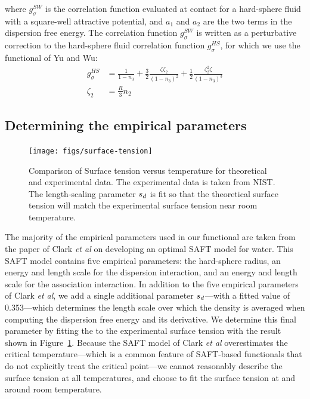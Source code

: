 \documentclass[letterpaper,twocolumn,amsmath,amssymb,prb]{revtex4-1}
\begin{document}
where $g^\textit{SW}_\sigma$ is the correlation function evaluated at
contact for a hard-sphere fluid with a square-well attractive
potential, and $a_1$ and $a_2$ are the two terms in the dispersion
free energy.  The correlation function $g^\textit{SW}_\sigma$ is
written as a perturbative correction to the hard-sphere fluid
correlation function $g^\textit{HS}_\sigma$, for which we use the
functional of Yu and Wu\cite{yu2002fmt-dft-inhomogeneous-associating}:
\begin{align}
  g_\sigma^{HS} &= \frac{1}{1-n_3}
  +\frac32\frac{\zeta\zeta_2}{(1-n_3)^2}
  + \frac12\frac{\zeta_2^2\zeta}{(1-n_3)^3} \\
  \zeta_2 &= \frac{R}{3}n_2
\end{align}

\subsection{Determining the empirical parameters}\label{sec:empirical}

\begin{figure}
\begin{center}
\texttt{[image: figs/surface-tension]}
\end{center}
\caption{Comparison of Surface tension versus temperature for theoretical and
  experimental data. The experimental data is taken from NIST.\cite{nistwater}
  The length-scaling parameter $s_d$ is fit so that the theoretical surface 
  tension will match the experimental surface tension near room temperature.}
\label{fig:surface-tension}
\end{figure}

The majority of the empirical parameters used in our functional are
taken from the paper of Clark \emph{et al} on developing an optimal
SAFT model for water\cite{clark2006developing}.  This SAFT model
contains five empirical parameters: the hard-sphere radius, an energy
and length scale for the dispersion interaction, and an energy and
length scale for the association interaction.  In addition to the five
empirical parameters of Clark \emph{et al}, we add a single additional
parameter $s_d$---with a fitted value of 0.353---which determines
the length scale over which the density is averaged when computing the
dispersion free energy and its derivative.  We determine this final
parameter by fitting the to the experimental surface tension with the
result shown in Figure~\ref{fig:surface-tension}.  Because the SAFT
model of Clark \emph{et al} overestimates the critical
temperature---which is a common feature of SAFT-based functionals that
do not explicitly treat the critical point---we cannot reasonably
describe the surface tension at all temperatures, and choose to fit
the surface tension at and around room temperature.
\end{document}
